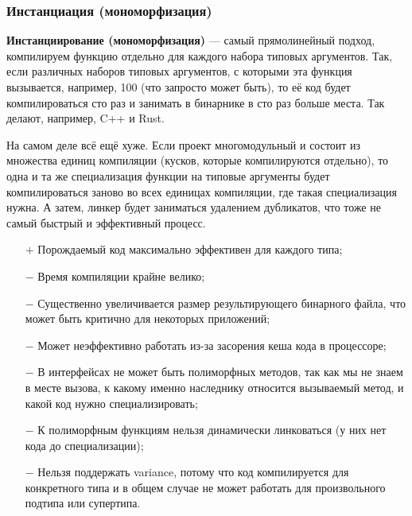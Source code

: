 \documentclass[12pt]{article}
\newcommand{\vocab}[1]{\textbf{#1}} %
\newcommand{\positive}{$+$} %
\newcommand{\negative}{{\color{red} $-$}} %
\begin{document}
    \subsubsection{Инстанциация (мономорфизация)}

    \vocab{Инстанциирование (мономорфизация)} --- самый прямолинейный подход, компилируем функцию отдельно для каждого набора типовых аргументов.
    Так, если различных наборов типовых аргументов, с которыми эта функция вызывается, например, 100 (что запросто может быть), то её код будет компилироваться сто раз и занимать в бинарнике в сто раз больше места.
    Так делают, например, C++ и Rust.

    На самом деле всё ещё хуже.
    Если проект многомодульный и состоит из множества единиц компиляции (кусков, которые компилируются отдельно), то одна и та же специализация функции на типовые аргументы будет компилироваться заново во всех единицах компиляции, где такая специализация нужна.
    А затем, линкер будет заниматься удалением дубликатов, что тоже не самый быстрый и эффективный процесс.

    \begin{itemize}
        \item[\positive] Порождаемый код максимально эффективен для каждого типа;
        \item[\negative] Время компиляции крайне велико;
        \item[\negative] Существенно увеличивается размер результирующего бинарного файла, что может быть критично для некоторых приложений;
        \item[\negative] Может неэффективно работать из-за засорения кеша кода в процессоре;
        \item[\negative] В интерфейсах не может быть полиморфных методов, так как мы не знаем в месте вызова, к какому именно наследнику относится вызываемый метод, и какой код нужно специализировать;
        \item[\negative] К полиморфным функциям нельзя динамически линковаться (у них нет кода до специализации);
        \item[\negative] Нельзя поддержать variance, потому что код компилируется для конкретного типа и в общем случае не может работать для произвольного подтипа или супертипа.
    \end{itemize}
\end{document}
